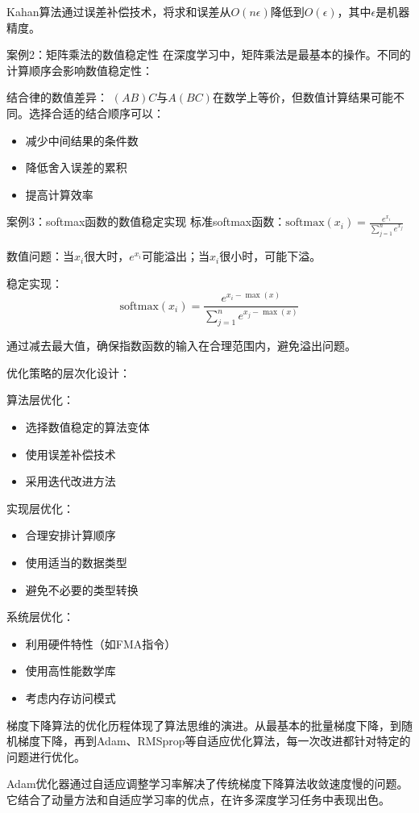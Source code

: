 Kahan算法通过误差补偿技术，将求和误差从$O(n\epsilon)$降低到$O(\epsilon)$，其中$\epsilon$是机器精度。

案例2：矩阵乘法的数值稳定性
在深度学习中，矩阵乘法是最基本的操作。不同的计算顺序会影响数值稳定性：

结合律的数值差异：
$(AB)C$与$A(BC)$在数学上等价，但数值计算结果可能不同。选择合适的结合顺序可以：
\begin{itemize}
\item 减少中间结果的条件数
\item 降低舍入误差的累积
\item 提高计算效率
\end{itemize}

案例3：softmax函数的数值稳定实现
标准softmax函数：$\text{softmax}(x_i) = \frac{e^{x_i}}{\sum_{j=1}^n e^{x_j}}$

数值问题：当$x_i$很大时，$e^{x_i}$可能溢出；当$x_i$很小时，可能下溢。

稳定实现：
$$\text{softmax}(x_i) = \frac{e^{x_i - \max(x)}}{\sum_{j=1}^n e^{x_j - \max(x)}}$$

通过减去最大值，确保指数函数的输入在合理范围内，避免溢出问题。

优化策略的层次化设计：

算法层优化：
\begin{itemize}
\item 选择数值稳定的算法变体
\item 使用误差补偿技术
\item 采用迭代改进方法
\end{itemize}

实现层优化：
\begin{itemize}
\item 合理安排计算顺序
\item 使用适当的数据类型
\item 避免不必要的类型转换
\end{itemize}

系统层优化：
\begin{itemize}
\item 利用硬件特性（如FMA指令）
\item 使用高性能数学库
\item 考虑内存访问模式
\end{itemize}

梯度下降算法的优化历程体现了算法思维的演进。从最基本的批量梯度下降，到随机梯度下降，再到Adam、RMSprop等自适应优化算法，每一次改进都针对特定的问题进行优化。

Adam优化器通过自适应调整学习率解决了传统梯度下降算法收敛速度慢的问题。它结合了动量方法和自适应学习率的优点，在许多深度学习任务中表现出色。

